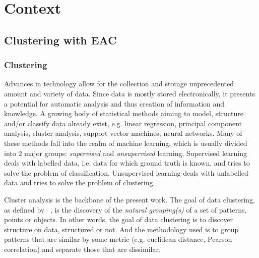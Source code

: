 \section{Context}
\label{sec:context}

\subsection{Clustering with EAC}

\subsubsection{Clustering}
\label{sec:clustering}

Advances in technology allow for the collection and storage unprecedented amount and variety of data. Since data is mostly stored electronically, it presents a potential for automatic analysis and thus creation of information and knowledge. A growing body of statistical methods aiming to model, structure and/or classify data already exist, e.g. linear regression, principal component analysis, cluster analysis, support vector machines, neural networks. Many of these methods fall into the realm of machine learning, which is usually divided into 2 major groups: \textit{supervised} and \textit{unsupervised} learning.
Supervised learning deals with labelled data, i.e. data for which ground truth is known, and tries to solve the problem of classification. Unsupervised learning deals with unlabelled data and tries to solve the problem of clustering.

Cluster analysis is the backbone of the present work.
The goal of data clustering, as defined by ~\cite{Jain2010}, is the discovery of the \textit{natural grouping(s)} of a set of patterns, points or objects. In other words, the goal of data clustering is to discover structure on data, structured or not.
And the methodology used is to group patterns that are similar by some metric (e.g. euclidean distance, Pearson correlation) and separate those that are dissimilar. %


